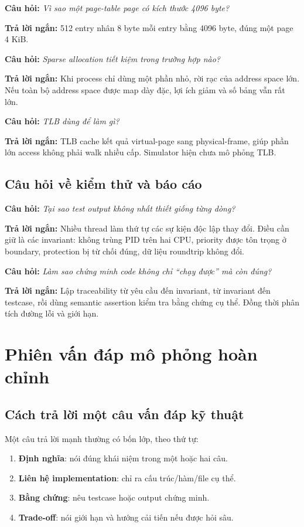 \documentclass[12pt,a4paper]{article}
\newcommand{\term}[1]{\textbf{\color{bkblue}#1}}
\newcommand{\question}[1]{\textbf{\color{bkgold}Câu hỏi:} \textit{#1}}
\newcommand{\answer}{\textbf{\color{bkblue}Trả lời ngắn:} }
\begin{document}
\question{Vì sao một page-table page có kích thước 4096 byte?}

\answer 512 entry nhân 8 byte mỗi entry bằng 4096 byte, đúng một page 4 KiB.

\question{Sparse allocation tiết kiệm trong trường hợp nào?}

\answer Khi process chỉ dùng một phần nhỏ, rời rạc của address space lớn. Nếu
toàn bộ address space được map dày đặc, lợi ích giảm và số bảng vẫn rất lớn.

\question{TLB dùng để làm gì?}

\answer TLB cache kết quả virtual-page sang physical-frame, giúp phần lớn
access không phải walk nhiều cấp. Simulator hiện chưa mô phỏng TLB.

\subsection{Câu hỏi về kiểm thử và báo cáo}

\question{Tại sao test output không nhất thiết giống từng dòng?}

\answer Nhiều thread làm thứ tự các sự kiện độc lập thay đổi. Điều cần giữ là
các invariant: không trùng PID trên hai CPU, priority được tôn trọng ở boundary,
protection bị từ chối đúng, dữ liệu roundtrip không đổi.

\question{Làm sao chứng minh code không chỉ ``chạy được'' mà còn đúng?}

\answer Lập traceability từ yêu cầu đến invariant, từ invariant đến testcase,
rồi dùng semantic assertion kiểm tra bằng chứng cụ thể. Đồng thời phân tích
đường lỗi và giới hạn.

\section{Phiên vấn đáp mô phỏng hoàn chỉnh}

\subsection{Cách trả lời một câu vấn đáp kỹ thuật}

Một câu trả lời mạnh thường có bốn lớp, theo thứ tự:

\begin{enumerate}
  \item \term{Định nghĩa}: nói đúng khái niệm trong một hoặc hai câu.
  \item \term{Liên hệ implementation}: chỉ ra cấu trúc/hàm/file cụ thể.
  \item \term{Bằng chứng}: nêu testcase hoặc output chứng minh.
  \item \term{Trade-off}: nói giới hạn và hướng cải tiến nếu được hỏi sâu.
\end{enumerate}
\end{document}
